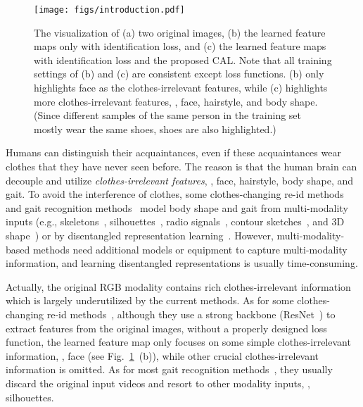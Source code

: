 \documentclass[10pt,twocolumn,letterpaper]{article}
\begin{document}
\begin{figure}[t]
	\centering
	\texttt{[image: figs/introduction.pdf]}\\
	\vspace{-5pt}
	\caption{The visualization of (a) two original images, (b) the learned feature maps only with identification loss, and (c) the learned feature maps with identification loss and the proposed CAL. Note that all training settings of (b) and (c) are consistent except loss functions. (b) only highlights face as the clothes-irrelevant features, while (c) highlights more clothes-irrelevant features, \eg, face, hairstyle, and body shape. (Since different samples of the same person in the training set mostly wear the same shoes, shoes are also highlighted.)}
	\vspace{-15pt}
	\label{fig:introduction}
\end{figure}


Humans can distinguish their acquaintances, even if these acquaintances wear clothes that they have never seen before.
The reason is that the human brain can decouple and utilize \emph{clothes-irrelevant features}, \eg, face, hairstyle, body shape, and gait.
To avoid the interference of clothes, some clothes-changing re-id methods~\cite{Hong2021Finegrained,Chen2021Learning3D} and gait recognition methods~\cite{Zhang2019Gait, Chao2019Gaitset} model body shape and gait from multi-modality inputs (e.g., skeletons~\cite{Qian2020LTCC}, silhouettes~\cite{Chao2019Gaitset}, radio signals~\cite{Fan2020Radio}, contour sketches~\cite{Yang2019PRCC}, and 3D shape~\cite{Chen2021Learning3D}) or by disentangled representation learning~\cite{Zhang2019Gait}.
However, multi-modality-based methods need additional models or equipment to capture multi-modality information, and learning disentangled representations is usually time-consuming.

Actually, the original RGB modality contains rich clothes-irrelevant information 
which is largely underutilized by the current methods. 
As for some clothes-changing re-id methods~\cite{Qian2020LTCC,Chen2021Learning3D}, although they use a strong backbone (\ie ResNet~\cite{He2016Deep}) to extract
features from the original images, without a properly designed
loss function, the learned feature map only focuses
on some simple clothes-irrelevant information, \eg, face (see Fig.~\ref{fig:introduction}~(b)), while other crucial clothes-irrelevant information is omitted. 
As for most gait recognition methods~\cite{Chao2019Gaitset, Han2006Individual}, they usually discard the original input videos and resort to other modality inputs, \eg, silhouettes.
\end{document}
